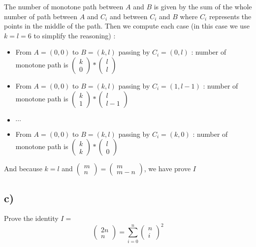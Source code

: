 \documentclass[a4paper,11pt]{report}
\begin{document}
The number of monotone path between $A$ and $B$ is given by the sum of the whole
number of path between $A$ and $C_i$ and between $C_i$ and $B$ where $C_i$
represents the points in the middle of the path. Then we compute each case (in
this case we use $k = l = 6$ to simplify the reasoning) :
\begin{itemize}
\item From $A = (0,0)$ to $B = (k,l)$ passing by $C_i = (0,l)$ : number of monotone path is $\begin{pmatrix} k \\ 0\end{pmatrix} * \begin{pmatrix} l \\ l \end{pmatrix}$
\item From $A = (0,0)$ to $B = (k,l)$ passing by $C_i = (1,l-1)$ : number of monotone path is $\begin{pmatrix} k \\ 1\end{pmatrix} * \begin{pmatrix} l \\ l-1 \end{pmatrix}$
\item $\cdots$
\item From $A = (0,0)$ to $B = (k,l)$ passing by $C_i = (k,0)$ : number of monotone path is $\begin{pmatrix} k \\ k\end{pmatrix} * \begin{pmatrix} l \\ 0 \end{pmatrix}$
\end{itemize}

And because $k = l$ and $\begin{pmatrix} m \\ n\end{pmatrix} = \begin{pmatrix} m
  \\ m - n\end{pmatrix}$, we have prove $I$

\subsection*{c)}

Prove the identity $I = $
$$
\begin{pmatrix} 2n \\ n\end{pmatrix} = \sum_{i=0}^{n} \begin{pmatrix} n \\ i\end{pmatrix}^2
$$
\end{document}
